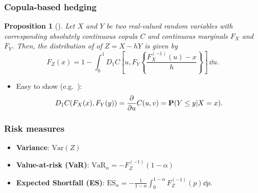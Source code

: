\documentclass[10pt,mathserif]{beamer}
\renewcommand{\(}{\begin{columns}}
\renewcommand{\)}{\end{columns}}
\newcommand{\<}[1]{\begin{column}{#1}}
\renewcommand{\>}{\end{column}}
\newtheorem{proposition}[theorem]{Proposition}
\theoremstyle{definition}
\begin{document}


\begin{frame}
  \frametitle{Copula-based hedging}
  \begin{proposition}[\cite{Barbi2014}]
  \label{prop:dfrh}
  Let $X$ and $Y$ be two real-valued random variables with
  corresponding 
  absolutely continuous copula $C$ and
  continuous marginals $F_X$ and $F_Y$. Then, the distribution
  of of $Z=X - h Y$ is given by
  \begin{equation}
    \label{eq:3}
    F_Z(x) = 1- \int^1_0 D_1 C
    \left[ u, F_Y \left\{ \frac{F^{(-1)}_X(u)-x}{h} \right\}
    \right]\, \dd u.
  \end{equation}
\end{proposition}
\begin{itemize}
\item Easy to show (e.g.\ \citet{McNeil2005}):
\begin{equation*}
  D_1 C(F_X(x), F_Y(y)) = \frac{\partial}{\partial u} C(u,v) = {\bf P}(Y\leq y|X=x).
\end{equation*}
\end{itemize}
\end{frame}

\begin{frame}
  \frametitle{Risk measures}
  \begin{itemize}
    \addtolength{\itemsep}{8pt}
  \item {\bf Variance}: $\text{Var}(Z)$
  \item {\bf Value-at-risk (VaR)}: $\text{VaR}_\alpha = -
    F_Z^{(-1)}(1-\alpha)$  
  \item {\bf Expected Shortfall (ES)}: 
    $\displaystyle \text{ES}_\alpha =-
    \frac{1}{1-\alpha}\int_{0}^{1-\alpha} F_Z^{(-1)}(p) \dd p$.
  \end{itemize}
\end{frame}
\end{document}
